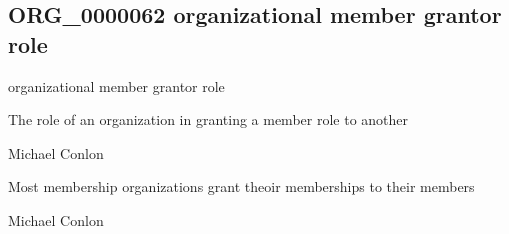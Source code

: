 \documentclass[letterpaper,10pt,english]{sphinxmanual}
\begin{document}
\subsection{ORG\_0000062 \sphinxhyphen{} organizational member grantor role}
\label{\detokenize{doc-ORG_0000062:org-0000062-organizational-member-grantor-role}}\label{\detokenize{doc-ORG_0000062:index-0}}\label{\detokenize{doc-ORG_0000062::doc}}
\begin{sphinxShadowBox}

\sphinxAtStartPar
organizational member grantor role
\end{sphinxShadowBox}

\begin{sphinxShadowBox}

\sphinxAtStartPar
{\hyperref[\detokenize{doc-BFO_0000023::doc}]{}}
\end{sphinxShadowBox}

\begin{sphinxShadowBox}

\sphinxAtStartPar
The role of an organization in granting a member role to another
\end{sphinxShadowBox}

\begin{sphinxShadowBox}

\sphinxAtStartPar
Michael Conlon 
\end{sphinxShadowBox}

\begin{sphinxShadowBox}

\sphinxAtStartPar
Most membership organizations grant theoir memberships to their members
\end{sphinxShadowBox}

\begin{sphinxShadowBox}

\sphinxAtStartPar
Michael Conlon 
\end{sphinxShadowBox}
\begin{quote}

\ignorespaces \end{quote}
\end{document}
